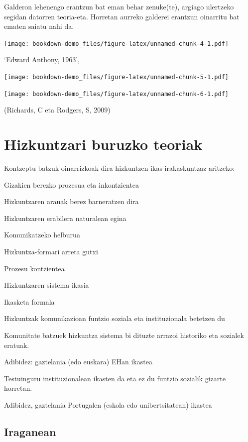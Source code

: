 \documentclass[
]{book}
\providecommand{\tightlist}{%
  \setlength{\itemsep}{0pt}\setlength{\parskip}{0pt}}
\begin{document}
Galderon lehenengo erantzun bat eman behar zenuke(te), argiago ulertzeko segidan datorren teoria-eta. Horretan aurreko galderei erantzun oinarritu bat ematen saiatu nahi da.

\texttt{[image: bookdown-demo\_files/figure-latex/unnamed-chunk-4-1.pdf]}

`Edward Anthony, 1963',

\texttt{[image: bookdown-demo\_files/figure-latex/unnamed-chunk-5-1.pdf]}

\texttt{[image: bookdown-demo\_files/figure-latex/unnamed-chunk-6-1.pdf]}

(Richards, C eta Rodgers, S, 2009)

\hypertarget{hizkuntzari-buruzko-teoriak}{%
\section{Hizkuntzari buruzko teoriak}\label{hizkuntzari-buruzko-teoriak}}

Kontzeptu batzuk oinarrizkoak dira hizkuntzen ikas-irakaskuntzaz aritzeko:

\begin{description}
\tightlist
\item[Hizkuntza jabekuntza]
Gizakien berezko prozesua eta inkontzientea

Hizkuntzaren arauak berez barneratzen dira

Hizkuntzaren erabilera naturalean egina

Komunikatzeko helburua

Hizkuntza-formari arreta gutxi
\item[Hizkuntza ikaskuntza]
Prozesu kontzientea

Hizkuntzaren sistema ikasia

Ikasketa formala
\item[Bigarren Hizkuntza]
Hizkuntzak komunikazioan funtzio soziala eta instituzionala betetzen du

Komunitate batzuek hizkuntza sistema bi dituzte arrazoi historiko eta sozialek eratuak.

Adibidez: gaztelania (edo euskara) EHan ikastea
\item[Atzerriko Hizkuntza]
Testuinguru instituzionalean ikasten da eta ez du funtzio sozialik gizarte horretan.

Adibidez, gaztelania Portugalen (eskola edo unibertsitatean) ikastea
\end{description}

\hypertarget{iraganean}{%
\subsection{Iraganean}\label{iraganean}}
\end{document}
